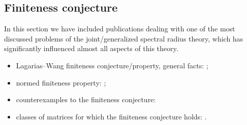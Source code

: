 \subsection*{Finiteness conjecture}

In this section we have included publications dealing with one of the most discussed problems of the joint/generalized spectral radius theory, which has significantly influenced almost all aspects of this theory.
\begin{itemize}
\item Lagarias--Wang finiteness conjecture/property, general facts: \cite{BTV:MTNS02, Charina:ACHA13, DHX:PAMS13, GugZen:LAA12, JenPoll:ETDS17, Koz:LAA16, Koz:WSDV16, LagWang:LAA95, Maesumi:TIC95, Morris:LAA10};
\item normed finiteness property: \cite{LiShih:LAA08};
\item counterexamples to the finiteness conjecture: \cite{BochiMor:PLMS15, BM:JAMS02, BTV:SIAMJMA03, CJ:IJAMCS07, HMST:AdvMath11, JenPoll:ETDS17, JP:SIAMJMA09, Koz:CDC05:e, Koz:WIAS05, Koz:INFOPROC06:e}
\item classes of matrices for which the finiteness conjecture holds: \cite{AhmJun14, AhmJng:NAHS16, BN:SIAMJMAA09, Charina:ACHA13, CGSZ:LAA10, CiconePhD11, Dai:ArXiv11, Dai:LAA13, DHLX:LAA12, DHX:ArXiv13-1, DHX:PAMS13, DK:INFOPROC11:e, Gurv:LAA95, GWZ:SIAMJMA05, JB:LAA08, JM:LAA13, Koz:LAA16, LagWang:LAA95, LiuXiao:LNCS12, Morris:LAA10, Morris:ArXiv11, PanScl:Nonlin21, PW:LAA08, WangWen:CIS13}.
\end{itemize}

